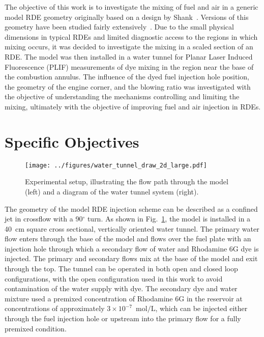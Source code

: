 \documentclass[10pt, twocolumn]{article}
\begin{document}
The objective of this work is to investigate the mixing of fuel and air in a generic model RDE geometry originally based on a design by Shank~\cite{Shank2012}. Versions of this geometry have been studied fairly extensively~\cite{Naples2013,Paxson2015,George2015,Driscoll2015,Anand2016b,Pandiya2016}. Due to the small physical dimensions in typical RDEs and limited diagnostic access to the regions in which mixing occurs, it was decided to investigate the mixing in a scaled section of an RDE. The model was then installed in a water tunnel for Planar Laser Induced Fluorescence (PLIF) measurements of dye mixing in the region near the base of the combustion annulus. The influence of the dyed fuel injection hole position, the geometry of the engine corner, and the blowing ratio was investigated with the objective of understanding the mechanisms controlling and limiting the mixing, ultimately with the objective of improving fuel and air injection in RDEs.

\section*{Specific Objectives} 
\begin{figure}[b!]
	\centering
	\texttt{[image: ../figures/water\_tunnel\_draw\_2d\_large.pdf]}
	\caption{Experimental setup, illustrating the flow path through the model (left) and a diagram of the water tunnel system (right).}
	\label{fig:exp_setup}
\end{figure}

The geometry of the model RDE injection scheme can be described as a confined jet in crossflow with a 90$^{\circ}$ turn. As shown in Fig.~\ref{fig:exp_setup}, the model is installed in a 40~cm square cross sectional, vertically oriented water tunnel. The primary water flow enters through the base of the model and flows over the fuel plate with an injection hole through which a secondary flow of water and Rhodamine 6G dye is injected. The primary and secondary flows mix at the base of the model and exit through the top. The tunnel can be operated in both open and closed loop configurations, with the open configuration used in this work to avoid contamination of the water supply with dye. The secondary dye and water mixture used a premixed concentration of Rhodamine 6G in the reservoir at concentrations of approximately $3\times10^{-7}$~$\textrm{mol}/\textrm{L}$, which can be injected either through the fuel injection hole or upstream into the primary flow for a fully premixed condition.
\end{document}
